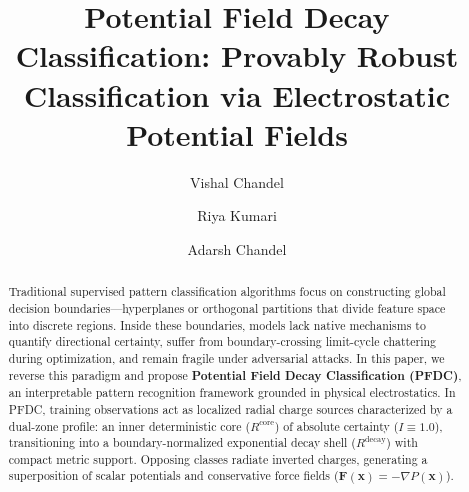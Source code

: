 \documentclass[times, review, 10pt]{elsarticle}
\begin{document}
\begin{frontmatter}

\title{Potential Field Decay Classification: Provably Robust Classification via Electrostatic Potential Fields}

\author[a]{Vishal Chandel}
\author[b]{Riya Kumari}
\author[c]{Adarsh Chandel}


\begin{abstract}
Traditional supervised pattern classification algorithms focus on constructing global decision boundaries---hyperplanes or orthogonal partitions that divide feature space into discrete regions. Inside these boundaries, models lack native mechanisms to quantify directional certainty, suffer from boundary-crossing limit-cycle chattering during optimization, and remain fragile under adversarial attacks. In this paper, we reverse this paradigm and propose \textbf{Potential Field Decay Classification (PFDC)}, an interpretable pattern recognition framework grounded in physical electrostatics. In PFDC, training observations act as localized radial charge sources characterized by a dual-zone profile: an inner deterministic core ($R^{\mathrm{core}}$) of absolute certainty ($I \equiv 1.0$), transitioning into a boundary-normalized exponential decay shell ($R^{\mathrm{decay}}$) with compact metric support. Opposing classes radiate inverted charges, generating a superposition of scalar potentials and conservative force fields ($\mathbf{F}(\mathbf{x}) = -\nabla P(\mathbf{x})$).


\end{abstract}
\end{frontmatter}
\end{document}
